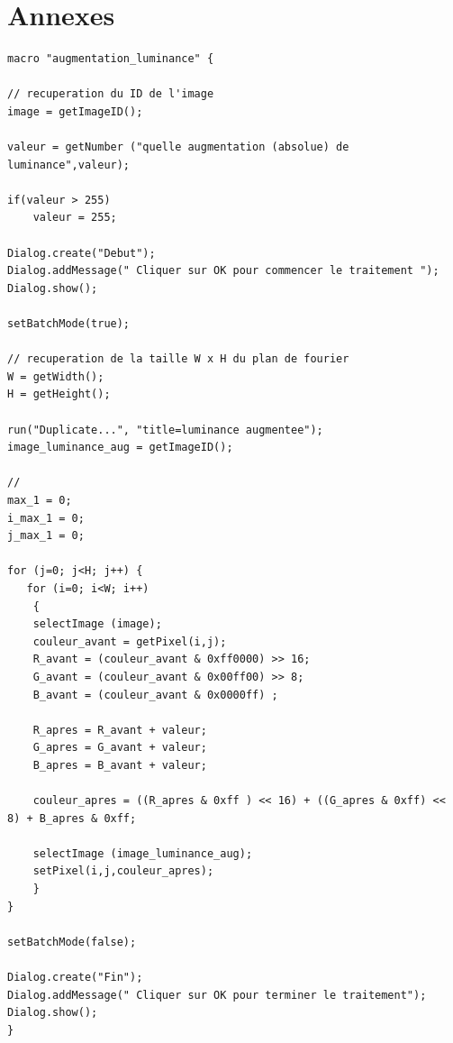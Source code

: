\documentclass[a4paper,10pt]{article}
\begin{document}
\section{Annexes}
\begin{lstlisting}[caption=Macros de modification de la luminance d'une image]
macro "augmentation_luminance" {

// recuperation du ID de l'image
image = getImageID();

valeur = getNumber ("quelle augmentation (absolue) de luminance",valeur);

if(valeur > 255) 
    valeur = 255;

Dialog.create("Debut");
Dialog.addMessage(" Cliquer sur OK pour commencer le traitement ");
Dialog.show();

setBatchMode(true);

// recuperation de la taille W x H du plan de fourier
W = getWidth();
H = getHeight();

run("Duplicate...", "title=luminance augmentee");
image_luminance_aug = getImageID();

// 
max_1 = 0; 
i_max_1 = 0;
j_max_1 = 0;

for (j=0; j<H; j++) {
   for (i=0; i<W; i++) 
	{
	selectImage (image);
	couleur_avant = getPixel(i,j);
	R_avant = (couleur_avant & 0xff0000) >> 16;
	G_avant = (couleur_avant & 0x00ff00) >> 8;
	B_avant = (couleur_avant & 0x0000ff) ;

	R_apres = R_avant + valeur;
	G_apres = G_avant + valeur;
	B_apres = B_avant + valeur;

	couleur_apres = ((R_apres & 0xff ) << 16) + ((G_apres & 0xff) << 8) + B_apres & 0xff;

	selectImage (image_luminance_aug);
	setPixel(i,j,couleur_apres);
	}
}

setBatchMode(false);

Dialog.create("Fin");
Dialog.addMessage(" Cliquer sur OK pour terminer le traitement");
Dialog.show();
}
\end{lstlisting}
\end{document}
